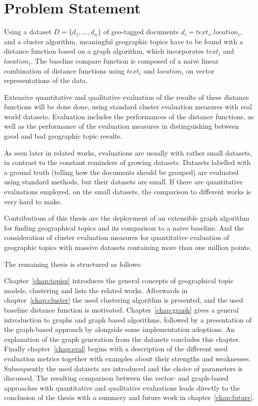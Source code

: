 \section{Problem Statement}
Using a dataset $D = \{d_1, \dots, d_n\}$ of geo-tagged documents $d_i = {text_i, location_i}$, and a cluster algorithm, meaningful geographic topics have to be found with a distance function based on a graph algorithm, which incorporates $text_i$ and $location_i$. The baseline compare function is composed of a naive linear combination of distance functions using $text_i$ and $location_i$ on vector representations of the data.

Extensive quantitative and qualitative evaluation of the results of these distance functions will be done done, using standard cluster evaluation measures with real world datasets. Evaluation includes the performances of the distance functions, as well as the performance of the evaluation measures in distinguishing between good and bad geographic topic results.

\vspace{.5em}
\noindent
As seen later in related works, evaluations are usually with rather small datasets, in contrast to the constant reminders of growing datasets. Datasets labelled with a ground truth (telling how the documents should be grouped) are evaluated using standard methods, but their datasets are small. If there are quantitative evaluations employed, on the small datasets, the comparison to different works is very hard to make.

Contributions of this thesis are the deployment of an extensible graph algorithm for finding geographical topics and its comparison to a naive baseline. And the consideration of cluster evaluation measures for quantitative evaluation of geographic topics with massive datasets containing more than one million points.

\vspace{.5em}
\noindent
The remaining thesis is structured as follows:

Chapter~\ref{chap:topics} introduces the general concepts of geographical topic models, clustering and lists the related works. Afterwards in chapter~\ref{chap:cluster} the used clustering algorithm is presented, and the used baseline distance function is motivated. Chapter~\ref{chap:graph} gives a general introduction to graphs and graph based algorithms, followed by a presentation of the graph-based approach by \textcite{Zhou2009} alongside some implementation adoptions. An explanation of the graph generation from the datasets concludes this chapter. Finally chapter~\ref{chap:eval} begins with a description of the different used evaluation metrics together with examples about their strengths and weaknesses. Subsequently the used datasets are introduced and the choice of parameters is discussed. The resulting comparison between the vector- and graph-based approaches with quantitative and qualitative evaluations leads directly to the conclusion of the thesis with a summery and future work in chapter~\ref{chap:future}.




